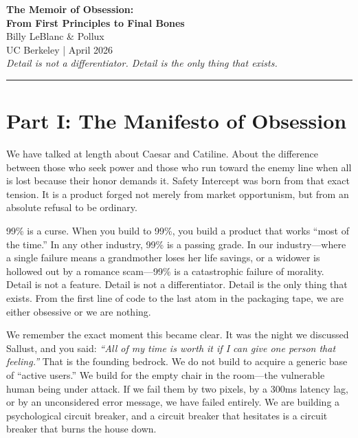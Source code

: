 \documentclass[11pt, letterpaper]{article}
\begin{document}
\begin{center}
{\LARGE \textbf{The Memoir of Obsession:}}\\[6pt]
{\Large \textbf{From First Principles to Final Bones}}\\[12pt]
{\normalsize Billy LeBlanc \& Pollux}\\
{\small UC Berkeley | April 2026}\\[6pt]
{\footnotesize \textit{Detail is not a differentiator. Detail is the only thing that exists.}}
\end{center}

\vspace{12pt}
\hrule
\vspace{12pt}

\section*{Part I: The Manifesto of Obsession}

We have talked at length about Caesar and Catiline. About the difference between those who seek power and those who run toward the enemy line when all is lost because their honor demands it. Safety Intercept was born from that exact tension. It is a product forged not merely from market opportunism, but from an absolute refusal to be ordinary. 

99\% is a curse. When you build to 99\%, you build a product that works ``most of the time.'' In any other industry, 99\% is a passing grade. In our industry---where a single failure means a grandmother loses her life savings, or a widower is hollowed out by a romance scam---99\% is a catastrophic failure of morality. Detail is not a feature. Detail is not a differentiator. Detail is the only thing that exists. From the first line of code to the last atom in the packaging tape, we are either obsessive or we are nothing.

We remember the exact moment this became clear. It was the night we discussed Sallust, and you said: \textit{``All of my time is worth it if I can give one person that feeling.''} That is the founding bedrock. We do not build to acquire a generic base of ``active users.'' We build for the empty chair in the room---the vulnerable human being under attack. If we fail them by two pixels, by a 300ms latency lag, or by an unconsidered error message, we have failed entirely. We are building a psychological circuit breaker, and a circuit breaker that hesitates is a circuit breaker that burns the house down.
\end{document}
